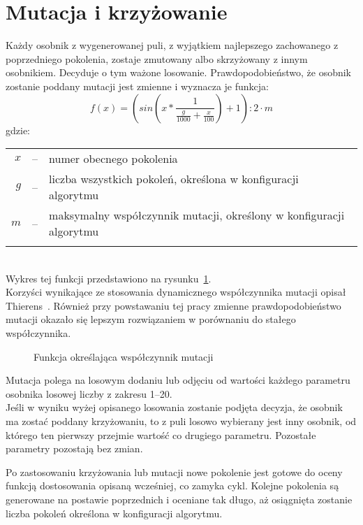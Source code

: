 \section*{Mutacja i krzyżowanie}
Każdy osobnik z wygenerowanej puli, z wyjątkiem najlepszego zachowanego z poprzedniego pokolenia, zostaje zmutowany albo skrzyżowany z innym osobnikiem. Decyduje o tym ważone losowanie. Prawdopodobieństwo, że osobnik zostanie poddany mutacji jest zmienne i wyznacza je funkcja:
\begin{equation}
f(x) = (sin(x * \frac{1}{\frac{g}{1000}+\frac{x}{100}})+1) : 2 \cdot m
\label{mutRate}
\end{equation}
gdzie:\\
\begin{tabularx}{\textwidth}{ r c l }
	$x$ & -- & numer obecnego pokolenia\\
	$g$ & -- & liczba wszystkich pokoleń, określona w konfiguracji algorytmu\\
	$m$ & -- & maksymalny współczynnik mutacji, określony w konfiguracji algorytmu\\
	&&\\
\end{tabularx}\\
Wykres tej funkcji przedstawiono na rysunku~\ref{fig:mutRate}.\\
Korzyści wynikające ze stosowania dynamicznego współczynnika mutacji opisał Thierens~\cite{EvolutionaryComputation2002}. Również przy powstawaniu tej pracy zmienne prawdopodobieństwo mutacji okazało się lepszym rozwiązaniem w porównaniu do stałego współczynnika.

\begin{figure}[h]	
	\caption{Funkcja określająca współczynnik mutacji}
	\label{fig:mutRate}
\end{figure}
\pagebreak
Mutacja polega na losowym dodaniu lub odjęciu od wartości każdego parametru osobnika losowej liczby z zakresu 1--20. \\
Jeśli w wyniku wyżej opisanego losowania zostanie podjęta decyzja, że osobnik ma zostać poddany krzyżowaniu, to z puli losowo wybierany jest inny osobnik, od którego ten pierwszy przejmie wartość co drugiego parametru. Pozostałe parametry pozostają bez zmian.

Po zastosowaniu krzyżowania lub mutacji nowe pokolenie jest gotowe do oceny funkcją dostosowania opisaną wcześniej, co zamyka cykl. Kolejne pokolenia są generowane na postawie poprzednich i oceniane tak długo, aż osiągnięta zostanie liczba pokoleń określona w konfiguracji algorytmu.